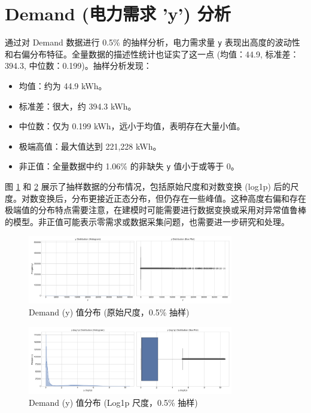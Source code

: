 \documentclass{article} %
\begin{document}
\section{Demand (电力需求 'y') 分析}
\label{sec:demand_analysis}

通过对 Demand 数据进行 0.5\% 的抽样分析，电力需求量 \texttt{y} 表现出高度的波动性和右偏分布特征。全量数据的描述性统计也证实了这一点 (均值：44.9, 标准差：394.3, 中位数：0.199)。抽样分析发现：
\begin{itemize}
    \item 均值：约为 44.9 kWh。
    \item 标准差：很大，约 394.3 kWh。
    \item 中位数：仅为 0.199 kWh，远小于均值，表明存在大量小值。
    \item 极端高值：最大值达到 221,228 kWh。
    \item 非正值：全量数据中约 1.06\% 的非缺失 \texttt{y} 值小于或等于 0。
\end{itemize}
图 \ref{fig:demand_y_dist_orig} 和 \ref{fig:demand_y_dist_log} 展示了抽样数据的分布情况，包括原始尺度和对数变换 (log1p) 后的尺度。对数变换后，分布更接近正态分布，但仍存在一些峰值。这种高度右偏和存在极端值的分布特点需要注意，在建模时可能需要进行数据变换或采用对异常值鲁棒的模型。非正值可能表示零需求或数据采集问题，也需要进一步研究和处理。

\begin{figure}[H] %
    \centering
    \includegraphics[width=0.8\textwidth]{../plots/Demand Value (y) Distribution (Original Scale, Sample).png}
    \caption{Demand (y) 值分布 (原始尺度，0.5\% 抽样)}
    \label{fig:demand_y_dist_orig}
\end{figure}

\begin{figure}[H]
    \centering
    \includegraphics[width=0.8\textwidth]{../plots/Demand Value (y) Distribution (Log1p Scale, Sample).png}
    \caption{Demand (y) 值分布 (Log1p 尺度，0.5\% 抽样)}
    \label{fig:demand_y_dist_log}
\end{figure}
\end{document}
